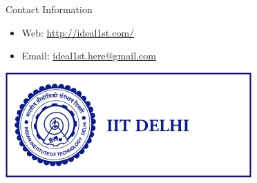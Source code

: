 \documentclass[final]{beamer}
\newlength{\sepwid}
\newlength{\onecolwid}
\begin{document}
\begin{frame}
\begin{columns}[t]
\begin{column}{\onecolwid}






\begin{block}{Contact Information}

\begin{itemize}
\item Web: \href{http://ideal1st.com/}{http://ideal1st.com/}
\item Email: \href{mailto:ideal1st.here@gmail.com}{ideal1st.here@gmail.com}
\end{itemize}

\end{block}

\begin{center}
\includegraphics[width=0.5\linewidth]{img/iitd_logo.jpg}
\end{center}





\end{column} %

\begin{column}{\sepwid}\end{column} %

\end{columns} %

\end{frame} %
\end{document}
